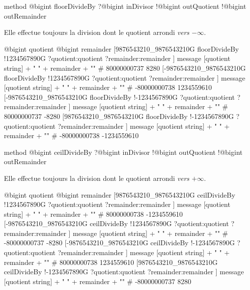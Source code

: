 \begin{galgas4box}
method @bigint floorDivideBy ?@bigint inDivisor
                             !@bigint outQuotient
                             !@bigint outRemainder
\end{galgas4box}

Elle effectue toujours la division dont le quotient arrondi \emph{vers $-\infty$}.

\begin{galgas4}
@bigint quotient
@bigint remainder
[9876543210_9876543210G floorDivideBy
  !1234567890G
  ?quotient:quotient
  ?remainder:remainder
]
message [quotient string] + " " + remainder + "\n" # 80000000737 8280
[-9876543210_9876543210G floorDivideBy
  !1234567890G
  ?quotient:quotient
  ?remainder:remainder
]
message [quotient string] + " " + remainder + "\n" # -80000000738 1234559610
[-9876543210_9876543210G floorDivideBy
  !-1234567890G
  ?quotient:quotient
  ?remainder:remainder
]
message [quotient string] + " " + remainder + "\n" # 80000000737 -8280
[9876543210_9876543210G floorDivideBy
  !-1234567890G
  ?quotient:quotient
  ?remainder:remainder
]
message [quotient string] + " " + remainder + "\n" # -80000000738 -1234559610
\end{galgas4}






\begin{galgas4box}
method @bigint ceilDivideBy ?@bigint inDivisor
                            !@bigint outQuotient
                            !@bigint outRemainder
\end{galgas4box}

Elle effectue toujours la division dont le quotient arrondi \emph{vers $+\infty$}.

\begin{galgas4}
@bigint quotient
@bigint remainder
[9876543210_9876543210G ceilDivideBy
  !1234567890G
  ?quotient:quotient
  ?remainder:remainder
]
message [quotient string] + " " + remainder + "\n" # 80000000738 -1234559610
[-9876543210_9876543210G ceilDivideBy
  !1234567890G
  ?quotient:quotient
  ?remainder:remainder
]
message [quotient string] + " " + remainder + "\n" # -80000000737 -8280
[-9876543210_9876543210G ceilDivideBy
  !-1234567890G
  ?quotient:quotient
  ?remainder:remainder
]
message [quotient string] + " " + remainder + "\n" # 80000000738 1234559610
[9876543210_9876543210G ceilDivideBy
  !-1234567890G
  ?quotient:quotient
  ?remainder:remainder
]
message [quotient string] + " " + remainder + "\n" # -80000000737 8280
\end{galgas4}








